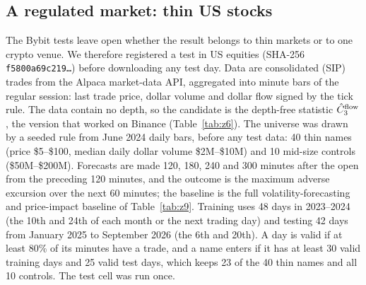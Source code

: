 \documentclass[12pt]{article}
\theoremstyle{definition}
\theoremstyle{remark}
\begin{document}
\subsection{A regulated market: thin US stocks}\label{sec:us}
The Bybit tests leave open whether the result belongs to thin markets or to one crypto venue. We therefore registered a test in US equities (SHA-256 \texttt{f5800a69c219\ldots}) before downloading any test day. Data are consolidated (SIP) trades from the Alpaca market-data API, aggregated into minute bars of the regular session: last trade price, dollar volume and dollar flow signed by the tick rule. The data contain no depth, so the candidate is the depth-free statistic $\hat C_3^{\rm flow}$, the version that worked on Binance (Table~\ref{tab:z6}). The universe was drawn by a seeded rule from June 2024 daily bars, before any test data: 40 thin names (price \$5--\$100, median daily dollar volume \$2M--\$10M) and 10 mid-size controls (\$50M--\$200M). Forecasts are made 120, 180, 240 and 300 minutes after the open from the preceding 120 minutes, and the outcome is the maximum adverse excursion over the next 60 minutes; the baseline is the full volatility-forecasting and price-impact baseline of Table~\ref{tab:z9}. Training uses 48 days in 2023--2024 (the 10th and 24th of each month or the next trading day) and testing 42 days from January 2025 to September 2026 (the 6th and 20th). A day is valid if at least 80\% of its minutes have a trade, and a name enters if it has at least 30 valid training days and 25 valid test days, which keeps 23 of the 40 thin names and all 10 controls. The test cell was run once.
\end{document}
